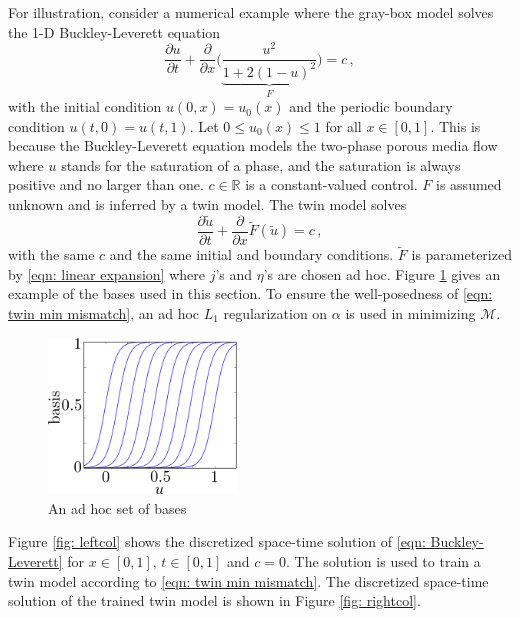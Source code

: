 For illustration, consider a numerical example where the gray-box model solves the 1-D Buckley-Leverett equation
\cite{Buckley Leverett}
\begin{equation}
    \frac{\partial u}{\partial t} + \frac{\partial}{\partial x}\Big(\underbrace{
    \frac{u^2}{1+ 2(1-u)^2}}_{F} \Big) = c\,,
    \label{eqn: Buckley-Leverett}
\end{equation}
with the initial condition $u(0,x)=u_0(x)$ and the periodic boundary condition $u(t,0)=u(t,1)$. 
Let $0 \le u_0(x) \le 1$ for all $x\in [0,1]$. This is because the 
Buckley-Leverett equation models the two-phase porous media flow where $u$ stands for the
saturation of a phase, and the saturation is always positive and no larger than one.
$c\in \mathbb{R}$ is a constant-valued control. $F$ is assumed unknown and is inferred by a twin model.
The twin model solves 
\begin{equation}
    \frac{\partial \tilde{u}}{\partial t} + \frac{\partial}{\partial x}\tilde{F}(\tilde{u})
    = c\,,
    \label{eqn: Buckley-Leverett twin}
\end{equation}
with the same $c$ and the same initial and boundary conditions. $\tilde{F}$ is parameterized by
\eqref{eqn: linear expansion} where
$j$'s and $\eta$'s are chosen ad hoc.
Figure \ref{fig: sigmoid basis ad hoc} gives an example of the bases used in this section.
To ensure the well-posedness of \eqref{eqn: twin min mismatch}, an 
ad hoc $L_1$ regularization on $\alpha$ is used in minimizing $\mathcal{M}$.\\
\begin{figure}[htbp]
    \begin{center}
        \includegraphics[width=5cm]{../fixed_basis_eg.png}
        \caption{An ad hoc set of bases}
        \label{fig: sigmoid basis ad hoc}
    \end{center}
\end{figure}

Figure \ref{fig: leftcol} shows the discretized space-time solution of \eqref{eqn: Buckley-Leverett}
for $x\in[0,1], \, t\in[0,1]$ and $c=0$. 
The solution is used to train a twin model according to \eqref{eqn: twin min mismatch}.
The discretized space-time solution of the trained twin model is shown in 
Figure \ref{fig: rightcol}.\\

